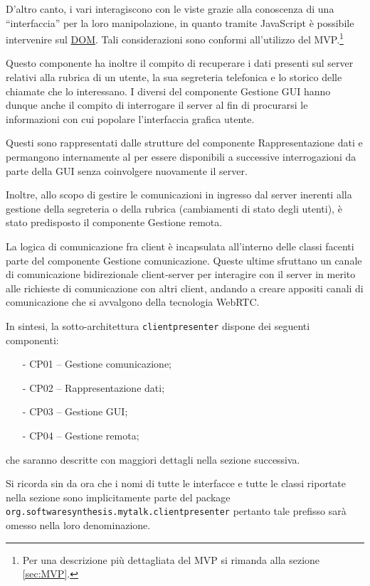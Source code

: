 D'altro canto, i vari  interagiscono con le viste grazie alla conoscenza di una ``interfaccia'' per la loro manipolazione, in quanto tramite JavaScript è possibile intervenire sul \underline{DOM}\@. Tali considerazioni sono conformi all'utilizzo del  MVP.\footnote{%
  Per una descrizione più dettagliata del  MVP si rimanda alla sezione \ref{sec:MVP}\@.
}

Questo componente ha inoltre il compito di recuperare i dati presenti sul server relativi alla rubrica di un utente, la sua segreteria telefonica e lo storico delle chiamate che lo interessano. I diversi  del componente \textsf{Gestione GUI} hanno dunque anche il compito di interrogare il server al fin di procurarsi le informazioni con cui popolare l'interfaccia grafica utente.

Questi sono rappresentati dalle strutture del componente \textsf{Rappresentazione dati} e permangono internamente al  per essere disponibili a successive interrogazioni da parte della GUI senza coinvolgere nuovamente il server.

Inoltre, allo scopo di gestire le comunicazioni in ingresso dal server inerenti alla gestione della segreteria o della rubrica (cambiamenti di stato degli utenti), è stato predisposto il componente \textsf{Gestione remota}.

La logica di comunicazione fra client è incapsulata all'interno delle classi facenti parte del componente \textsf{Gestione comunicazione}. Queste ultime sfruttano un canale di comunicazione bidirezionale client-server per interagire con il server in merito alle richieste di comunicazione con altri client, andando a creare appositi canali di comunicazione che si avvalgono della tecnologia WebRTC\@.

In sintesi, la sotto-architettura \texttt{clientpresenter} dispone dei seguenti componenti:
\begin{itemize}[noitemsep,nolistsep]
	\item[-] \textsf{CP01 -- Gestione comunicazione};
	\item[-] \textsf{CP02 -- Rappresentazione dati};
	\item[-] \textsf{CP03 -- Gestione GUI};
	\item[-] \textsf{CP04 -- Gestione remota};
\end{itemize}
che saranno descritte con maggiori dettagli nella sezione successiva.

Si ricorda sin da ora che i nomi di tutte le interfacce e tutte le classi riportate nella sezione sono implicitamente parte del package \texttt{org.softwaresynthesis.mytalk.clientpresenter} pertanto tale prefisso sarà omesso nella loro denominazione.

